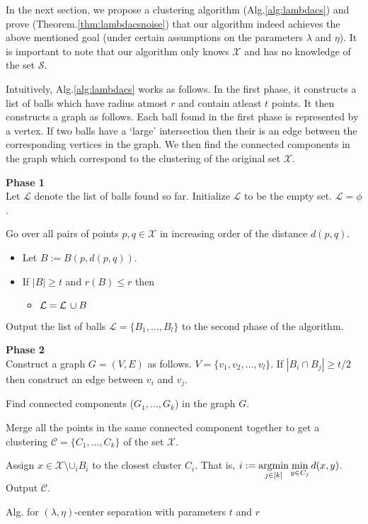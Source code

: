 \documentclass[anon,12pt]{colt2016} %
\newcommand{\mc}{\mathcal}
\begin{document}
In the next section, we propose a clustering algorithm (Alg.\ref{alg:lambdacs}) and prove (Theorem.\ref{thm:lambdacsnoise}) that our algorithm indeed achieves the above mentioned goal (under certain assumptions on the parameters $\lambda$ and $\eta$). It is important to note that our algorithm only knows $\mc X$ and has no knowledge of the set $\mc S$. 

Intuitively, Alg.\ref{alg:lambdacs} works as follows. In the first phase, it constructs a list of balls which have radius atmost $r$ and contain atleast $t$ points. It then constructs a graph as follows. Each ball found in the first phase is represented by a vertex. If two balls have a `large' intersection then their is an edge between the corresponding vertices in the graph. We then find the connected components in the graph which correspond to the clustering of the original set $\mc X$. 


\begin{algorithm}[!ht]
	\KwIn{$(\mc X, d), t$ and $r$}
	\KwOut{A clustering $\mc C$ of the set $\mc X$.}
	
	\vspace{0.1in}\textbf{Phase 1}\\
	Let $\mc L$ denote the list of balls found so far. Initialize $\mc L$ to be the empty set. $\mc L = \phi$.
	
	Go over all pairs of points $p, q \in \mc X$ in increasing order of the distance $d(p, q)$. 		\begin{itemize}[noitemsep, nolistsep]
	\renewcommand\labelitemi{}
	\item Let $B := B(p, d(p, q))$. 
	\item If $|B| \ge t$ and $r(B) \le r$ then
		\begin{itemize}[noitemsep, nolistsep]
		\renewcommand\labelitemii{}
		\item $\mc L = \mc L \thinspace\cup B$
		\end{itemize}
	\end{itemize}
	Output the list of balls $\mc L = \{B_1, \ldots, B_l\}$ to the second phase of the algorithm.
	
	\vspace{0.1in}\textbf{Phase 2}\\
	Construct a graph $G = (V, E)$ as follows. $V = \{v_1, v_2, \ldots, v_l\}$. If $|B_i \cap B_j| \ge t/2$ then construct an edge between $v_i$ and $v_j$.
	
	Find connected components ($G_1, \ldots, G_{k}$) in the graph $G$. 
	
	Merge all the points in the same connected component together to get a clustering $\mc C = \{C_1, \ldots, C_k\}$ of the set $\mc X$.
	
	Assign $x \in \mc X \setminus \mc \cup_i B_i$ to the closest cluster $C_i$. That is, $i := \argmin\limits_{j\in [k]} \min\limits_{y \in C_j}d(x, y)$. Output $\mc C$. 
\caption{Alg. for $(\lambda, \eta)$-center separation with parameters $t$ and $r$}
\label{alg:lambdacs}
\end{algorithm}
\end{document}
